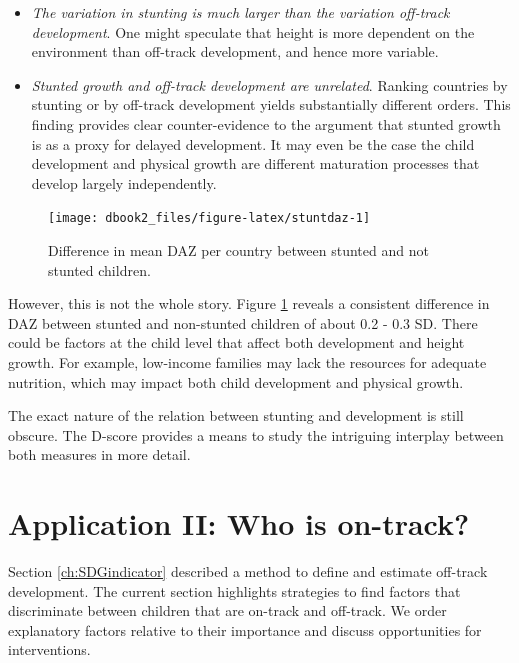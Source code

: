 \documentclass[
]{book}
\providecommand{\tightlist}{%
  \setlength{\itemsep}{0pt}\setlength{\parskip}{0pt}}
\begin{document}
\begin{itemize}
\tightlist
\item
  \emph{The variation in stunting is much larger than the variation off-track development}. One might speculate that height is more dependent on the environment than off-track development, and hence more variable.
\item
  \emph{Stunted growth and off-track development are unrelated}. Ranking countries by stunting or by off-track development yields substantially different orders. This finding provides clear counter-evidence to the argument that stunted growth is as a proxy for delayed development. It may even be the case the child development and physical growth are different maturation processes that develop largely independently.
\end{itemize}

\begin{figure}

{\centering \texttt{[image: dbook2\_files/figure-latex/stuntdaz-1]} 

}

\caption{Difference in mean DAZ per country between stunted and not stunted children.}\label{fig:stuntdaz}
\end{figure}



However, this is not the whole story. Figure \ref{fig:stuntdaz} reveals a consistent difference in DAZ between stunted and non-stunted children of about 0.2 - 0.3 SD. There could be factors at the child level that affect both development and height growth. For example, low-income families may lack the resources for adequate nutrition, which may impact both child development and physical growth.

The exact nature of the relation between stunting and development is still obscure. The D-score provides a means to study the intriguing interplay between both measures in more detail.

\hypertarget{ch:ontrack}{%
\chapter{Application II: Who is on-track?}\label{ch:ontrack}}

Section \ref{ch:SDGindicator} described a method to define and estimate off-track development. The current section highlights strategies to find factors that discriminate between children that are on-track and off-track. We order explanatory factors relative to their importance and discuss opportunities for interventions.
\end{document}
